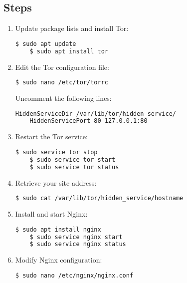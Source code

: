 \documentclass[a4paper,12pt]{article}
\begin{document}
\subsection{Steps}
\begin{enumerate}
    \item Update package lists and install Tor:
    \begin{lstlisting}[language=bash, breaklines=true, columns=fullflexible]
    $ sudo apt update
    $ sudo apt install tor
    \end{lstlisting}

   \item Edit the Tor configuration file:
    \begin{lstlisting}[language=bash, breaklines=true, columns=fullflexible]
    $ sudo nano /etc/tor/torrc
    \end{lstlisting}
    Uncomment the following lines:
    \begin{lstlisting}[language=bash, breaklines=true, columns=fullflexible]
    HiddenServiceDir /var/lib/tor/hidden_service/
    HiddenServicePort 80 127.0.0.1:80
    \end{lstlisting}

    \item Restart the Tor service:
    \begin{lstlisting}[language=bash, breaklines=true, columns=fullflexible]
    $ sudo service tor stop
    $ sudo service tor start
    $ sudo service tor status
    \end{lstlisting}

    \item Retrieve your site address:
    \begin{lstlisting}[language=bash, breaklines=true, columns=fullflexible]
    $ sudo cat /var/lib/tor/hidden_service/hostname
    \end{lstlisting}

    \item Install and start Nginx:
    \begin{lstlisting}[language=bash, breaklines=true, columns=fullflexible]
    $ sudo apt install nginx
    $ sudo service nginx start
    $ sudo service nginx status
    \end{lstlisting}

\item Modify Nginx configuration:
\begin{lstlisting}[language=bash, breaklines=true, columns=fullflexible]
$ sudo nano /etc/nginx/nginx.conf
\end{lstlisting}


\end{enumerate}
\end{document}

